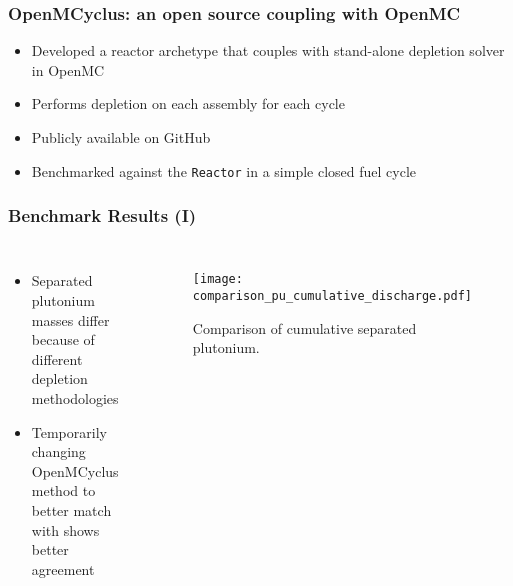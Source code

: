 \begin{frame}
    \frametitle{OpenMCyclus: an open source coupling with OpenMC}
    \begin{itemize}
        \item Developed a reactor archetype that couples \Cyclus with 
              stand-alone depletion solver in OpenMC
        \item Performs depletion on each assembly for each cycle
        \item Publicly available on GitHub \cite{bachmann_openmcyclus_2023}
        \item Benchmarked against the \Cycamore \texttt{Reactor} in a 
              simple closed fuel cycle
    \end{itemize}
\end{frame}

\begin{frame}
    \frametitle{Benchmark Results (I)}
    \begin{columns}
        \column[t]{4cm}
        \begin{itemize}
            \item Separated plutonium masses differ because of 
                  different depletion methodologies
            \item Temporarily changing OpenMCyclus method to better 
                  match with \Cycamore shows better agreement
        \end{itemize}
        \column[t]{6cm}
        \begin{figure}
            \centering 
            \texttt{[image: comparison\_pu\_cumulative\_discharge.pdf]}
            \caption{Comparison of cumulative separated plutonium.}
        \end{figure}
    \end{columns}
\end{frame}

